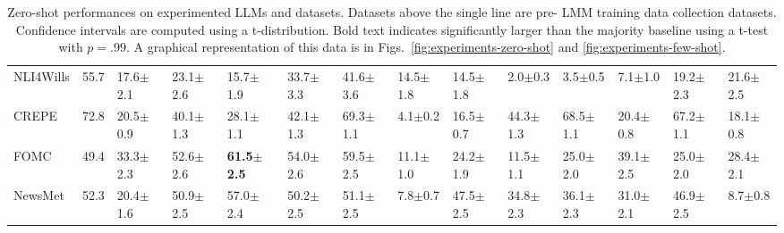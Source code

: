\documentclass[letterpaper]{article} %
\begin{document}
\begin{table}[h!]
{\begin{tabular}{l||l|lllll||lllllll}
  NLI4Wills &     55.7 &  17.6$\pm$2.1 &           23.1$\pm$2.6 &           15.7$\pm$1.9 &           33.7$\pm$3.3 &           41.6$\pm$3.6 &           14.5$\pm$1.8 &  14.5$\pm$1.8 &   2.0$\pm$0.3 &            \multicolumn{1}{|l}{3.5$\pm$0.5} &            7.1$\pm$1.0 &           19.2$\pm$2.3 &           21.6$\pm$2.5 \\ \cline{11-14}
      CREPE &     72.8 &  20.5$\pm$0.9 &           40.1$\pm$1.3 &           28.1$\pm$1.1 &           42.1$\pm$1.3 &           69.3$\pm$1.1 &            4.1$\pm$0.2 &  16.5$\pm$0.7 &  44.3$\pm$1.3 &           68.5$\pm$1.1 &           20.4$\pm$0.8 &           67.2$\pm$1.1 &           18.1$\pm$0.8 \\
       FOMC &     49.4 &  33.3$\pm$2.3 &           52.6$\pm$2.6 &  \textbf{61.5$\pm$2.5} &           54.0$\pm$2.6 &           59.5$\pm$2.5 &           11.1$\pm$1.0 &  24.2$\pm$1.9 & 11.5$\pm$1.1 & 25.0$\pm$2.0 & 39.1$\pm$2.5 & 25.0$\pm$2.0 & 28.4$\pm$2.1 \\
    NewsMet &     52.3 &  20.4$\pm$1.6 &           50.9$\pm$2.5 &           57.0$\pm$2.4 &           50.2$\pm$2.5 &           51.1$\pm$2.5 &            7.8$\pm$0.7 &  47.5$\pm$2.5 &  34.8$\pm$2.3 &           36.1$\pm$2.3 &           31.0$\pm$2.1 &           46.9$\pm$2.5 &            8.7$\pm$0.8 \\
\end{tabular}}
\caption{Zero-shot performances on experimented LLMs and datasets. Datasets above the single line are pre- LMM training data collection datasets. Confidence intervals are computed using a t-distribution. Bold text indicates significantly larger than the majority baseline using a t-test with $p=.99$. A graphical representation of this data is in Figs.~\ref{fig:experiments-zero-shot} and \ref{fig:experiments-few-shot}.}
\label{tab:zero-shot}
\end{table}
\end{document}
